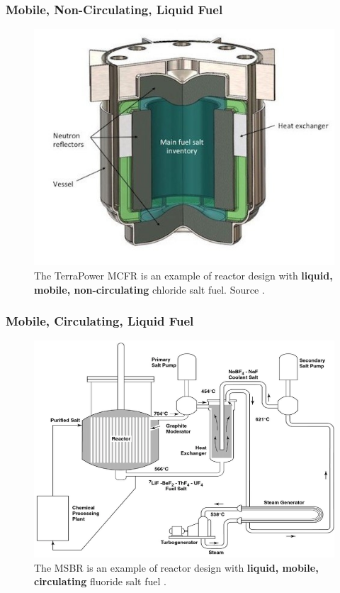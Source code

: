 \begin{frame}
\frametitle{Mobile, Non-Circulating, Liquid Fuel}
\begin{figure}[t]
\vspace*{-0.1in}
\hspace*{-0.35in}
\includegraphics[height=0.6\textwidth]{./images/mcfr-crossection.jpg}
\caption{The TerraPower MCFR is an example of reactor design with \textbf{liquid, mobile, non-circulating} chloride salt fuel. Source \cite{doene_southern_2018}.}
\end{figure}   

\end{frame}

\begin{frame}
\frametitle{Mobile, Circulating, Liquid Fuel}
\begin{figure}[t]
\includegraphics[height=0.58\textwidth]{./images/msbr_scheme.png}
\caption{The \gls{MSBR} is an example of reactor design with \textbf{liquid, mobile, circulating} fluoride salt fuel \cite{rosenthal_molten-salt_1970}.}
\end{figure}   

\end{frame}

